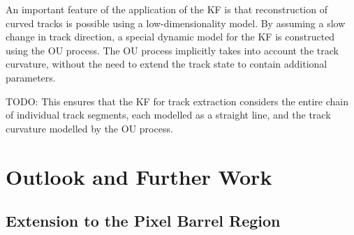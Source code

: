 An important feature of the application of the KF is that reconstruction of curved tracks is possible using a low-dimensionality model. By assuming a slow change in track direction, a special dynamic model for the KF is constructed using the OU process. The OU process implicitly takes into account the track curvature, without the need to extend the track state to contain additional parameters.


TODO: 
This ensures that the KF for track extraction considers the entire chain of individual track segments, each modelled as a straight line, and the track curvature modelled by the OU process.







\section{Outlook and Further Work}
\label{chapter-7-outlook}

\subsection{Extension to the Pixel Barrel Region}



